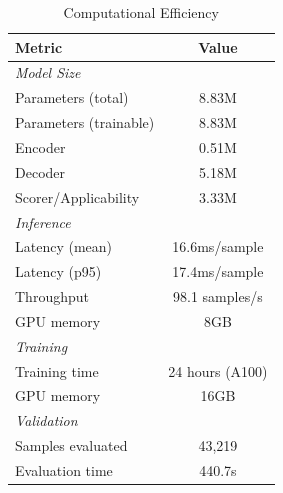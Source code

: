 \begin{table}[t]
\centering
\caption{Computational Efficiency}
\label{tab:efficiency}
\begin{tabular}{lc}
\toprule
\textbf{Metric} & \textbf{Value} \\
\midrule
\multicolumn{2}{l}{\textit{Model Size}} \\
Parameters (total) & 8.83M \\
Parameters (trainable) & 8.83M \\
\quad Encoder & 0.51M \\
\quad Decoder & 5.18M \\
\quad Scorer/Applicability & 3.33M \\
\midrule
\multicolumn{2}{l}{\textit{Inference}} \\
Latency (mean) & 16.6ms/sample \\
Latency (p95) & 17.4ms/sample \\
Throughput & 98.1 samples/s \\
GPU memory & 8GB \\
\midrule
\multicolumn{2}{l}{\textit{Training}} \\
Training time & 24 hours (A100) \\
GPU memory & 16GB \\
\midrule
\multicolumn{2}{l}{\textit{Validation}} \\
Samples evaluated & 43,219 \\
Evaluation time & 440.7s \\
\bottomrule
\end{tabular}
\end{table}
